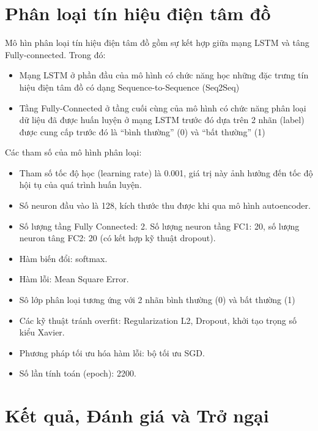 \section{Phân loại tín hiệu điện tâm đồ}
Mô hìn phân loại tín hiệu điện tâm đồ gồm sự kết hợp giữa mạng LSTM và tâng Fully-connected. Trong đó:
\begin{itemize}
    \item Mạng LSTM ở phần đầu của mô hình có chức năng học những đặc trưng tín hiệu điện tâm đồ có dạng Sequence-to-Sequence (Seq2Seq)
    \item Tầng Fully-Connected ở tầng cuối cùng của mô hình có chức năng phân loại dữ liệu đã được huấn luyện ở mạng LSTM trước đó dựa trên 2 nhãn (label) được cung cấp trước đó là “bình thường” (0) và “bất thường” (1)
\end{itemize}
Các tham số của mô hình phân loại:
\begin{itemize}
    \item Tham số tốc độ học (learning rate) là 0.001, giá trị này ảnh hưởng đến tốc độ hội tụ của quá trình huấn luyện.
    \item Số neuron đầu vào là 128, kích thước thu được khi qua mô hình autoencoder.
    \item Số lượng tầng Fully Connected: 2. Số lượng neuron tầng FC1: 20, số lượng neuron tâng FC2: 20 (có kết hợp kỹ thuật dropout).
    \item Hàm biến đổi: softmax.
    \item Hàm lỗi: Mean Square Error.
    \item Sô lớp phân loại tương ứng với 2 nhãn bình thường (0) và bất thường (1)
    \item Các kỹ thuật tránh overfit: Regularization L2, Dropout, khởi tạo trọng số kiểu Xavier.
    \item Phương pháp tối ưu hóa hàm lỗi: bộ tối ưu SGD.
    \item Số lần tính toán (epoch): 2200.
\end{itemize}

\section{Kết quả, Đánh giá và Trở ngại}
